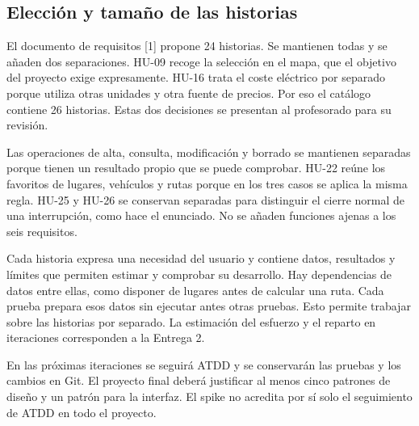 \subsection*{Elección y tamaño de las historias}
El documento de requisitos [1] propone 24 historias. Se mantienen todas y se añaden dos separaciones. HU-09 recoge la selección en el mapa, que el objetivo del proyecto exige expresamente. HU-16 trata el coste eléctrico por separado porque utiliza otras unidades y otra fuente de precios. Por eso el catálogo contiene 26 historias. Estas dos decisiones se presentan al profesorado para su revisión.\par
Las operaciones de alta, consulta, modificación y borrado se mantienen separadas porque tienen un resultado propio que se puede comprobar. HU-22 reúne los favoritos de lugares, vehículos y rutas porque en los tres casos se aplica la misma regla. HU-25 y HU-26 se conservan separadas para distinguir el cierre normal de una interrupción, como hace el enunciado. No se añaden funciones ajenas a los seis requisitos.\par
Cada historia expresa una necesidad del usuario y contiene datos, resultados y límites que permiten estimar y comprobar su desarrollo. Hay dependencias de datos entre ellas, como disponer de lugares antes de calcular una ruta. Cada prueba prepara esos datos sin ejecutar antes otras pruebas. Esto permite trabajar sobre las historias por separado. La estimación del esfuerzo y el reparto en iteraciones corresponden a la Entrega 2.\par
En las próximas iteraciones se seguirá ATDD y se conservarán las pruebas y los cambios en Git. El proyecto final deberá justificar al menos cinco patrones de diseño y un patrón para la interfaz. El spike no acredita por sí solo el seguimiento de ATDD en todo el proyecto.\par
